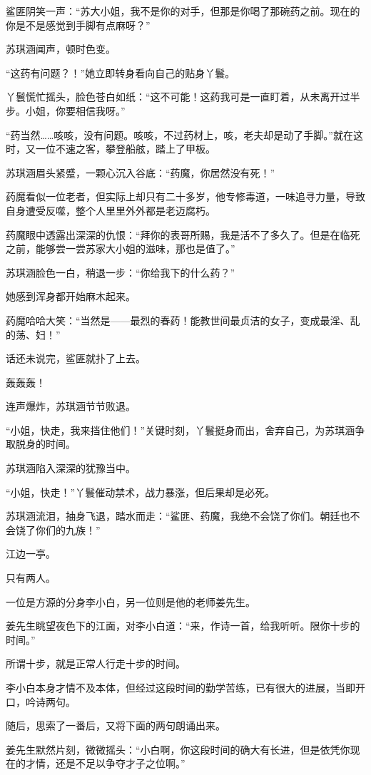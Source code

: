 \begin{this_body}
鲨匪阴笑一声：“苏大小姐，我不是你的对手，但那是你喝了那碗药之前。现在的你是不是感觉到手脚有点麻呀？”

苏琪涵闻声，顿时色变。

“这药有问题？！”她立即转身看向自己的贴身丫鬟。

丫鬟慌忙摇头，脸色苍白如纸：“这不可能！这药我可是一直盯着，从未离开过半步。小姐，你要相信我呀。”

“药当然……咳咳，没有问题。咳咳，不过药材上，咳，老夫却是动了手脚。”就在这时，又一位不速之客，攀登船舷，踏上了甲板。

苏琪涵眉头紧蹙，一颗心沉入谷底：“药魔，你居然没有死！”

药魔看似一位老者，但实际上却只有二十多岁，他专修毒道，一味追寻力量，导致自身遭受反噬，整个人里里外外都是老迈腐朽。

药魔眼中透露出深深的仇恨：“拜你的表哥所赐，我是活不了多久了。但是在临死之前，能够尝一尝苏家大小姐的滋味，那也是值了。”

苏琪涵脸色一白，稍退一步：“你给我下的什么药？”

她感到浑身都开始麻木起来。

药魔哈哈大笑：“当然是——最烈的春药！能教世间最贞洁的女子，变成最淫、乱的荡、妇！”

话还未说完，鲨匪就扑了上去。

轰轰轰！

连声爆炸，苏琪涵节节败退。

“小姐，快走，我来挡住他们！”关键时刻，丫鬟挺身而出，舍弃自己，为苏琪涵争取脱身的时间。

苏琪涵陷入深深的犹豫当中。

“小姐，快走！”丫鬟催动禁术，战力暴涨，但后果却是必死。

苏琪涵流泪，抽身飞退，踏水而走：“鲨匪、药魔，我绝不会饶了你们。朝廷也不会饶了你们的九族！”

江边一亭。

只有两人。

一位是方源的分身李小白，另一位则是他的老师姜先生。

姜先生眺望夜色下的江面，对李小白道：“来，作诗一首，给我听听。限你十步的时间。”

所谓十步，就是正常人行走十步的时间。

李小白本身才情不及本体，但经过这段时间的勤学苦练，已有很大的进展，当即开口，吟诗两句。

随后，思索了一番后，又将下面的两句朗诵出来。

姜先生默然片刻，微微摇头：“小白啊，你这段时间的确大有长进，但是依凭你现在的才情，还是不足以争夺才子之位啊。”


\end{this_body}
